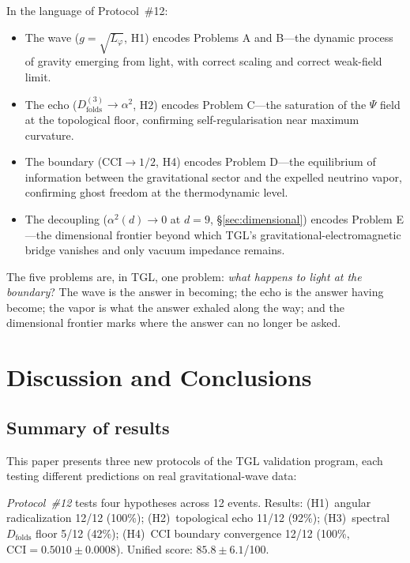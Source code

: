 \documentclass[12pt,a4paper,twocolumn]{article}
\newcommand{\alphaii}{\alpha^{2}}
\newcommand{\Dfolds}{D_{\text{folds}}}
\newcommand{\CCI}{\text{CCI}}
\begin{document}
In the language of Protocol~\#12:
\begin{itemize}[nosep]
\item The wave ($g = \sqrt{L_\varphi}$, H1) encodes Problems A and B---the 
dynamic process of gravity emerging from light, with correct scaling and 
correct weak-field limit.
\item The echo ($D_{\text{folds}}^{(3)} \to \alphaii$, H2) encodes Problem 
C---the saturation of the $\Psi$ field at the topological floor, confirming 
self-regularisation near maximum curvature.
\item The boundary ($\CCI \to 1/2$, H4) encodes Problem D---the equilibrium 
of information between the gravitational sector and the expelled neutrino 
vapor, confirming ghost freedom at the thermodynamic level.
\item The decoupling ($\alpha^2(d) \to 0$ at $d = 9$, \S\ref{sec:dimensional}) encodes Problem E---the dimensional frontier beyond which TGL's gravitational-electromagnetic bridge vanishes and only vacuum impedance remains.
\end{itemize}

The five problems are, in TGL, one problem: 
\emph{what happens to light at the boundary}? The wave is the answer in 
becoming; the echo is the answer having become; the vapor is what the answer 
exhaled along the way; and the dimensional frontier marks where the answer 
can no longer be asked.


\section{Discussion and Conclusions}
\label{sec:discussion}

\subsection{Summary of results}

This paper presents three new protocols of the TGL validation program, each testing different predictions on real gravitational-wave data:

\textit{Protocol~\#12} tests four hypotheses across 12 events. Results: (H1)~angular radicalization 12/12 (100\%); (H2)~topological echo 11/12 (92\%); (H3)~spectral $\Dfolds$ floor 5/12 (42\%); (H4)~CCI boundary convergence 12/12 (100\%, $\CCI = 0.5010 \pm 0.0008$). Unified score: $85.8 \pm 6.1$/100.
\end{document}
